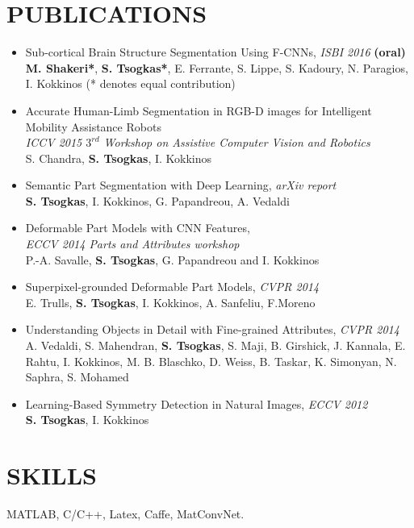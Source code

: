 \documentclass[margin]{res}
\begin{document}
\begin{resume}
\section{PUBLICATIONS} 
	\begin{itemize}
	\item  Sub-cortical Brain Structure Segmentation Using F-CNNs, \emph{ISBI 2016} \textbf{(oral)}\\
		  \textbf{M. Shakeri*}, \textbf{S. Tsogkas*}, E. Ferrante, S. Lippe, S. Kadoury, N. Paragios, I. Kokkinos (* denotes equal contribution)   
	\item   Accurate Human-Limb Segmentation in RGB-D images for Intelligent Mobility Assistance Robots\\
		   \emph{ICCV 2015 $3^{rd}$ Workshop on Assistive Computer Vision and Robotics}\\
		  S. Chandra, \textbf{S. Tsogkas}, I. Kokkinos
	\item   Semantic Part Segmentation with Deep Learning, \emph{arXiv report}\\
		  \textbf{S. Tsogkas}, I. Kokkinos, G. Papandreou, A. Vedaldi 
	\item  Deformable Part Models with CNN Features,\\ \emph{ECCV 2014 Parts and Attributes workshop}\\
	  P.-A. Savalle, \textbf{S. Tsogkas}, G. Papandreou and I. Kokkinos 
	\item  Superpixel-grounded Deformable Part Models, \emph{CVPR 2014}\\
		  E. Trulls, \textbf{S. Tsogkas}, I. Kokkinos, A. Sanfeliu, F.Moreno
	\item Understanding Objects in Detail with Fine-grained Attributes, \emph{CVPR 2014} \\
	A. Vedaldi, S. Mahendran, \textbf{S. Tsogkas}, S. Maji, B. Girshick, J. Kannala, E. Rahtu, I. Kokkinos, M. B. Blaschko, D. Weiss, B. Taskar, K. Simonyan, N. Saphra, S. Mohamed 
	\item Learning-Based Symmetry Detection in Natural Images, \emph{ECCV 2012} \\
		  \textbf{S. Tsogkas}, I. Kokkinos
	\end{itemize}

\section{SKILLS} MATLAB, C/C++, Latex, Caffe, MatConvNet. 
\newline


\end{resume}
\end{document}
